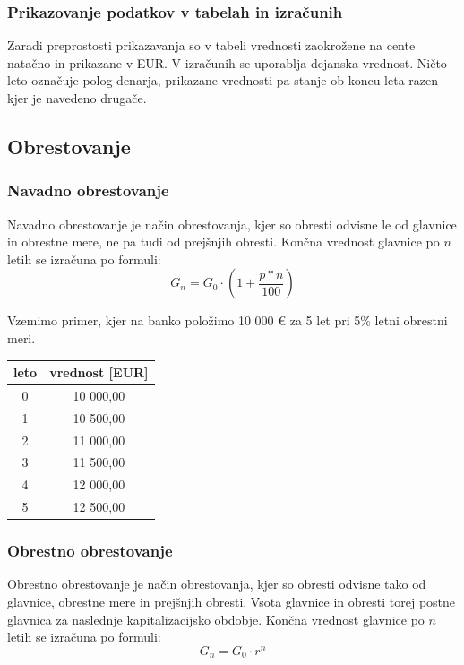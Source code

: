 \documentclass[12pt]{article}
\begin{document}
        \subsubsection{Prikazovanje podatkov v tabelah in izračunih}
        Zaradi preprostosti prikazavanja so v tabeli vrednosti zaokrožene na cente natačno
        in prikazane v EUR. V izračunih se uporablja dejanska vrednost. Ničto leto označuje
        polog denarja, prikazane vrednosti pa stanje ob koncu leta razen kjer je navedeno 
        drugače. 
    \subsection{Obrestovanje}
        \subsubsection{Navadno obrestovanje}
        Navadno obrestovanje je način obrestovanja, kjer so obresti odvisne le od glavnice
        in obrestne mere, ne pa tudi od prejšnjih obresti. Končna vrednost glavnice po $n$
        letih se izračuna po formuli:
        \begin{equation}
            G_n = G_0 \cdot (1 + \frac{p*n}{100})
        \end{equation}

        Vzemimo primer, kjer na banko položimo 10 000 € za 5 let pri 5\% letni obrestni meri. 
        \begin{center}
            
            \begin{tabular}{|c|c|}
                \hline
                \textbf{leto} & \textbf{vrednost [EUR]} \\ \hline
                0 & 10 000,00 \\ \hline
                1 & 10 500,00 \\ \hline
                2 & 11 000,00 \\ \hline
                3 & 11 500,00 \\ \hline
                4 & 12 000,00 \\ \hline
                5 & 12 500,00 \\ \hline
            \end{tabular}
        \end{center}

        \subsubsection{Obrestno obrestovanje}
        Obrestno obrestovanje je način obrestovanja, kjer so obresti odvisne tako od 
        glavnice, obrestne mere in prejšnjih obresti. Vsota glavnice in obresti torej 
        postne glavnica za naslednje kapitalizacijsko obdobje. Končna vrednost glavnice 
        po $n$ letih se izračuna po formuli:
        \begin{equation}
            G_n = G_0 \cdot r^n
        \end{equation}
\end{document}
